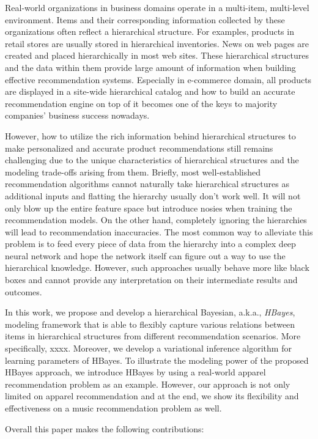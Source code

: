 Real-world organizations in business domains operate in a multi-item, multi-level environment. Items and their corresponding information collected by these organizations often reflect a hierarchical structure. For examples, products in retail stores are usually stored in hierarchical inventories. News on web pages are created and placed hierarchically in most web sites. These hierarchical structures and the data within them provide large amount of information when building effective recommendation systems. Especially in e-commerce domain, all products are displayed in a site-wide hierarchical catalog and how to build an accurate recommendation engine on top of it becomes one of the keys to majority companies' business success nowadays. 

However, how to utilize the rich information behind hierarchical structures to make personalized and accurate product recommendations still remains challenging due to the unique characteristics of hierarchical structures and the modeling trade-offs arising from them. Briefly, most well-established recommendation algorithms cannot naturally take hierarchical structures as additional inputs and flatting the hierarchy usually don't work well. It will not only blow up the entire feature space but introduce nosies when training the recommendation models. On the other hand, completely ignoring the hierarchies will lead to recommendation inaccuracies. The most common way to alleviate this problem is to feed every piece of data from the hierarchy into a complex deep neural network and hope the network itself can figure out a way to use the hierarchical knowledge. However, such approaches usually behave more like black boxes and cannot provide any interpretation on their intermediate results and outcomes.

In this work, we propose and develop a hierarchical Bayesian, a.k.a., \emph{HBayes}, modeling framework that is able to flexibly capture various relations between items in hierarchical structures from different recommendation scenarios. More specifically, xxxx. Moreover, we develop a variational inference algorithm for learning parameters of HBayes. To illustrate the modeling power of the proposed HBayes approach, we introduce HBayes by using a real-world apparel recommendation problem as an example. However, our approach is not only limited on apparel recommendation and at the end, we show its flexibility and effectiveness on a music recommendation problem as well.


Overall this paper makes the following contributions:

